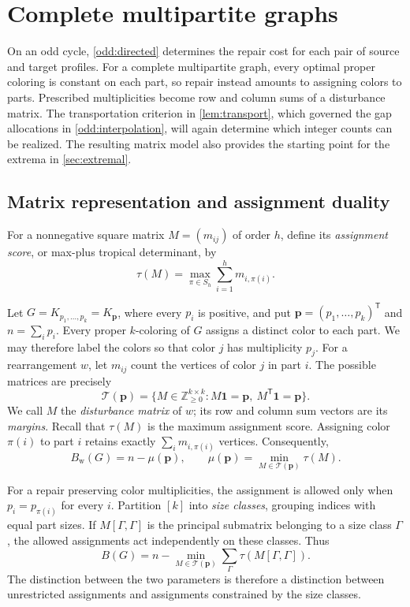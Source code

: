 \documentclass[11pt,reqno]{amsart}
\numberwithin{equation}{section}
\theoremstyle{definition}
\theoremstyle{remark}
\begin{document}
\section{Complete multipartite graphs}\label{sec:mp}

On an odd cycle, \cref{odd:directed} determines the repair cost for
each pair of source and target profiles. For a complete multipartite
graph, every optimal proper coloring is constant on each part, so
repair instead amounts to assigning colors to parts. Prescribed
multiplicities become row and column sums of a disturbance matrix.
The transportation criterion in \cref{lem:transport}, which governed
the gap allocations in \cref{odd:interpolation}, will again determine
which integer counts can be realized. The resulting matrix model also
provides the starting point for the extrema in \cref{sec:extremal}.

\subsection{Matrix representation and assignment duality}

For a nonnegative square matrix $M=(m_{ij})$ of order $h$, define its
\emph{assignment score}, or max-plus tropical determinant, by
\[
 \tau(M)=\max_{\pi\in S_h}\sum_{i=1}^h m_{i,\pi(i)}.
\]

Let $G=K_{p_1,\ldots,p_k}=K_{\mathbf p}$, where every $p_i$ is positive, and put
$\mathbf p=(p_1,\ldots,p_k)^{\mathsf T}$ and $n=\sum_i p_i$.
Every proper $k$-coloring of $G$ assigns a distinct color to each part.
We may therefore label the colors so that color $j$ has multiplicity
$p_j$. For a rearrangement $w$, let $m_{ij}$ count the vertices of color
$j$ in part $i$. The possible matrices are precisely
\[
 \mathcal T(\mathbf p)=\{M\in\mathbb Z_{\ge0}^{k\times k}:
 M\mathbf1=\mathbf p,\ M^{\mathsf T}\mathbf1=\mathbf p\}.
\]
We call $M$ the \emph{disturbance matrix} of $w$; its row and column
sum vectors are its \emph{margins}.
Recall that $\tau(M)$ is the maximum assignment score. Assigning color
$\pi(i)$ to part $i$ retains exactly
$\sum_i m_{i,\pi(i)}$ vertices. Consequently,
\begin{equation}\label{eq:mp:matrix-weak}
 B_{\mathrm w}(G)=n-\mu(\mathbf p),\qquad
 \mu(\mathbf p)=\min_{M\in\mathcal T(\mathbf p)}\tau(M).
\end{equation}

For a repair preserving color multiplicities, the assignment is allowed
only when $p_i=p_{\pi(i)}$ for every $i$. Partition $[k]$ into
\emph{size classes}, grouping indices with equal part sizes. If
$M[\Gamma,\Gamma]$ is the principal submatrix belonging to a size class
$\Gamma$, the allowed assignments act independently on these classes.
Thus
\begin{equation}\label{eq:mp:matrix-ordinary}
 B(G)=n-\min_{M\in\mathcal T(\mathbf p)}
       \sum_{\Gamma}\tau(M[\Gamma,\Gamma]).
\end{equation}
The distinction between the two parameters is therefore a distinction
between unrestricted assignments and assignments constrained by the
size classes.
\end{document}
